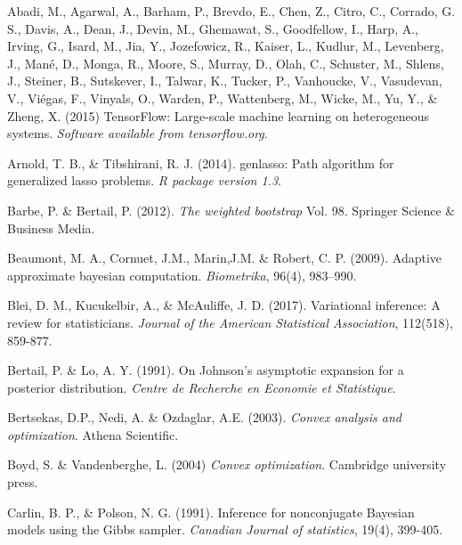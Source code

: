 \documentclass[12pt]{TD-CJS}
\begin{document}
\begin{thebibliography}{}

Abadi, M., Agarwal, A., Barham, P., Brevdo, E., Chen, Z., Citro, C., Corrado, G. S., Davis, A., Dean, J., Devin, M., Ghemawat, S., Goodfellow, I., Harp, A., Irving, G., Isard, M., Jia, Y., Jozefowicz, R., Kaiser, L., Kudlur, M., Levenberg, J., Man\'{e}, D., Monga, R., Moore, S., Murray, D., Olah, C., Schuster, M., Shlens, J., Steiner, B., Sutskever, I., Talwar, K., Tucker, P., Vanhoucke, V., Vasudevan, V., Vi\'{e}gas, F., Vinyals, O., Warden, P., Wattenberg, M., Wicke, M., Yu, Y., \& Zheng, X. (2015) TensorFlow: Large-scale machine learning on heterogeneous systems. {\it Software available from tensorflow.org}.

Arnold, T. B., \& Tibshirani, R. J. (2014). genlasso: Path algorithm for generalized lasso problems. {\it R package version 1.3}.

Barbe, P. \& Bertail, P. (2012). {\em The weighted bootstrap} Vol. 98. Springer Science \& Business Media.

Beaumont, M. A.,  Cornuet, J.M.,  Marin,J.M. \& Robert, C. P. (2009). Adaptive approximate bayesian computation. {\it Biometrika}, 96(4), 983--990.

Blei, D. M., Kucukelbir, A., \& McAuliffe, J. D. (2017). Variational inference: A review for statisticians. {\it Journal of the American Statistical Association}, 112(518), 859-877.

Bertail, P. \& Lo,  A. Y.  (1991). On Johnson's asymptotic expansion for a posterior distribution. {\it Centre de Recherche en Economie et Statistique}.

Bertsekas, D.P., Nedi, A. \& Ozdaglar, A.E. (2003). {\em Convex analysis and optimization}. Athena Scientific.

Boyd, S. \& Vandenberghe, L. (2004) {\it Convex optimization}. Cambridge university press.

Carlin, B. P., \& Polson, N. G. (1991). Inference for nonconjugate Bayesian models using the Gibbs sampler. {\it Canadian Journal of statistics}, 19(4), 399-405.


\end{thebibliography}
\end{document}
